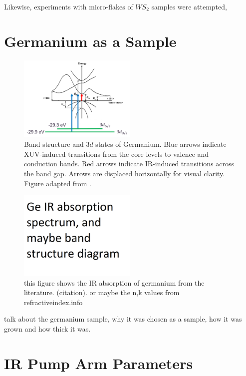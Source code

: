 Likewise, experiments with micro-flakes of $WS_2$ samples were attempted, 



\section{Germanium as a Sample}

\begin{figure}
	\centering
	\includegraphics[width=0.5\textwidth]{figures/chap3/Ge_band_diagram.png}
	\caption{Band structure and $3d$ states of Germanium. Blue arrows indicate XUV-induced transitions from the core levels to valence and conduction bands. Red arrows indicate IR-induced transitions across the band gap. Arrows are displaced horizontally for visual clarity. Figure adapted from \cite{NSMArchivePhysical}.}
	\label{fig:Ge_band_diagram}
\end{figure}

\begin{figure}
	\centering
	\includegraphics[width=0.5\textwidth]{figures/chap3/Ge_IR_absorption.png}
	\caption{this figure shows the IR absorption of germanium from the literature. (citation). or maybe the n,k values from refractiveindex.info}
	\label{fig:Ge_IR_absorption}
\end{figure}

talk about the germanium sample, why it was chosen as a sample, how it was grown and how thick it was.



\section{IR Pump Arm Parameters}

